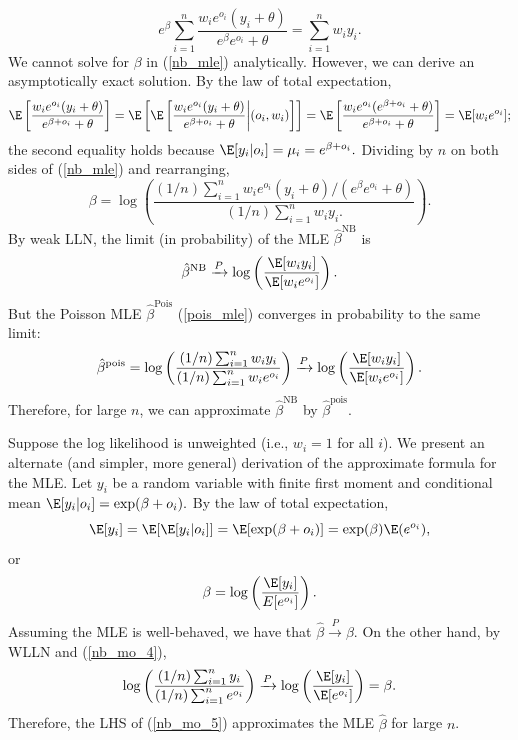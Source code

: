 \documentclass[12pt]{article}
\begin{document}
\begin{appendices}
\begin{equation}
e^\beta \sum_{i=1}^n \frac{w_i e^{o_i} (y_i + \theta)}{e^\beta e^{o_i} + \theta} = \sum_{i=1}^n w_i y_i.
\end{equation}
We cannot solve for $\beta$ in (\ref{nb_mle}) analytically. However, we can derive an asymptotically exact solution. By the law of total expectation,
$$ \E \left[\frac{w_i  e^{o_i} (y_i + \theta)}{e^{\beta + o_i} + \theta} \right] = \E \left[\E\left[\frac{w_i e^{o_i} (y_i + \theta) }{e^{\beta + o_i} + \theta} \bigg| (o_i, w_i) \right] \right] = \E \left[\frac{w_i e^{o_i} (e^{\beta + o_i} + \theta)}{ e^{\beta + o_i} + \theta} \right] = \E [w_i e^{o_i}];
$$
the second equality holds because $\E[y_i | o_i ] = \mu_i = e^{\beta + o_i}.$ Dividing by $n$ on both sides of (\ref{nb_mle}) and rearranging,
\begin{equation}\label{nb_mo_3}
\beta = \log\left( \frac{ (1/n) \sum_{i=1}^n w_i e^{o_i} (y_i + \theta)/(e^\beta e^{o_i} + \theta)}{ (1/n) \sum_{i=1}^n w_i y_i. } \right).
\end{equation}
By weak LLN, the limit (in probability) of the MLE $\hat{\beta}^\textrm{NB}$ is
\begin{equation}
\hat{\beta}^{\textrm{NB}} \xrightarrow{P} \log\left(\frac{\E[w_i y_i]}{\E[w_i e^{o_i}]} \right).
\end{equation}
But the Poisson MLE $\hat{\beta}^{\textrm{Pois}}$ (\ref{pois_mle}) converges in probability to the same limit:
$$ \hat{\beta}^{\textrm{pois}} =  \log \left(\frac{ (1/n) \sum_{i=1}^n w_i y_i}{(1/n)\sum_{i=1}^n w_i e^{o_i}} \right) \xrightarrow{P} \log \left(\frac{\E[w_i y_i]}{ \E[w_i e^{o_i}]} \right).$$ Therefore, for large $n$, we can approximate $\hat{\beta}^{\textrm{NB}}$ by $\hat{\beta}^{\textrm{pois}}$.

Suppose the log likelihood is unweighted (i.e., $w_i = 1$ for all $i$). We present an alternate (and simpler, more general) derivation of the approximate formula for the MLE. Let $y_i$ be a random variable with finite first moment and conditional mean $\E[y_i | o_i] = \exp(\beta + o_i).$ By the law of total expectation,
$$ \E[y_i] = \E[\E[ y_i | o_i]] = \E[\exp(\beta + o_i)] = \exp(\beta) \E(e^{o_i}),$$ or
\begin{equation}\label{nb_mo_4}
\beta = \log\left(\frac{\E[y_i]}{E[e^{o_i}]} \right).
\end{equation}
Assuming the MLE is well-behaved, we have that $\hat{\beta} \xrightarrow{P} \beta.$ On the other hand, by WLLN and (\ref{nb_mo_4}),
\begin{equation}\label{nb_mo_5}
\log\left( \frac{(1/n) \sum_{i=1}^n y_i }{(1/n) \sum_{i=1}^n e^{o_i}} \right) \xrightarrow{P}  \log\left(\frac{ \E[y_i] }{ \E[e^{o_i}] } \right) = \beta.
\end{equation}
 Therefore, the LHS of (\ref{nb_mo_5}) approximates the MLE $\hat{\beta}$ for large $n$.


\end{appendices}
\end{document}
